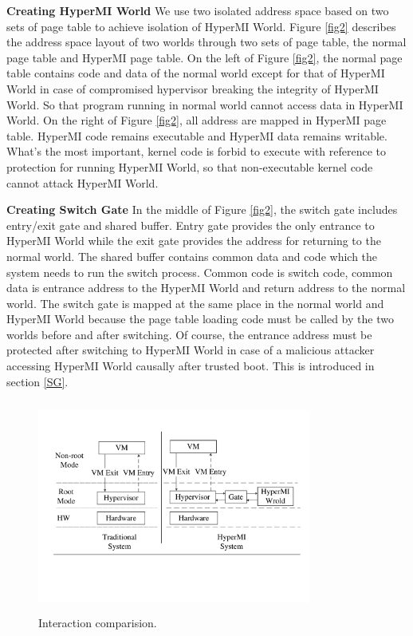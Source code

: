 \documentclass[conference]{IEEEtran}
\begin{document}
\textbf{Creating HyperMI World}
 We use two isolated address space based on two sets of page table to achieve isolation of HyperMI World.
Figure \ref{fig2} describes the address space layout of two worlds through two sets of page table, the normal page table and HyperMI page table. On the left of Figure \ref{fig2}, the normal page table contains code and data of the normal world except for that of HyperMI World in case of compromised hypervisor breaking the integrity of HyperMI World. So that program running in normal world cannot access data in HyperMI World. On the right of Figure \ref{fig2}, all address are mapped in HyperMI page table.
HyperMI code remains executable and HyperMI data remains writable. What's the most important, kernel code is forbid to execute with reference to protection for running HyperMI World, so that non-executable kernel code  cannot attack HyperMI World.

\textbf{Creating Switch Gate}
In the middle of Figure \ref{fig2}, the switch gate includes entry/exit gate and shared buffer. Entry gate provides the only entrance to HyperMI World while the exit gate provides the address for returning to the normal world. The shared buffer contains common data and code which the system needs to run the switch process. Common code is switch code, common data is entrance address to the HyperMI World and return address to the normal world. The switch gate is mapped at the same place in the normal world and HyperMI World because the page table loading code must be called by the two worlds before and after switching. Of course, the entrance address must be protected after switching to HyperMI World in case of a malicious attacker accessing HyperMI World causally after trusted boot. This is introduced in section \ref{SG}.


\begin{figure}
\centerline{\includegraphics[width=9cm, height=7cm]{pdfvmcsProcess.pdf}}
\caption{Interaction comparision. } \label{fig+1}
\end{figure}
\end{document}

